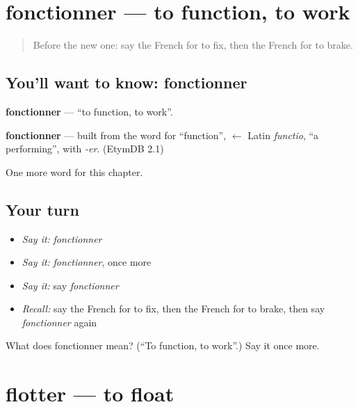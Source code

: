 \section[fonctionner]{fonctionner — to function, to work}

\label{lesson:FR-C212-fonctionner}



\begin{quote}
Before the new one: say the French for to fix, then the French for to brake.
\end{quote}

\subsection*{You'll want to know: fonctionner}
\textbf{fonctionner} — \textquotedblleft{}to function, to work\textquotedblright{}.

\begin{cousinweb}
\textbf{fonctionner} — built from the word for \textquotedblleft{}function\textquotedblright{}, $\leftarrow$ Latin \emph{functio}, \textquotedblleft{}a performing\textquotedblright{}, with \emph{-er}. (EtymDB 2.1)
\end{cousinweb}

\begin{grammarlens}[title={What you've built}]
One more word for this chapter.
\end{grammarlens}

\subsection*{Your turn}
\begin{itemize}
\raggedright
  \item \emph{Say it:} \emph{fonctionner}
  \item \emph{Say it:} \emph{fonctionner}, once more
  \item \emph{Say it:} say \emph{fonctionner}
  \item \emph{Recall:} say the French for to fix, then the French for to brake, then say \emph{fonctionner} again
\end{itemize}

\begin{tcolorbox}[breakable,colback=teal!4,colframe=teal!35!black,title={Before you move on}]
What does fonctionner mean? (\textquotedblleft{}To function, to work\textquotedblright{}.) Say it once more.
\end{tcolorbox}
\section[flotter]{flotter — to float}

